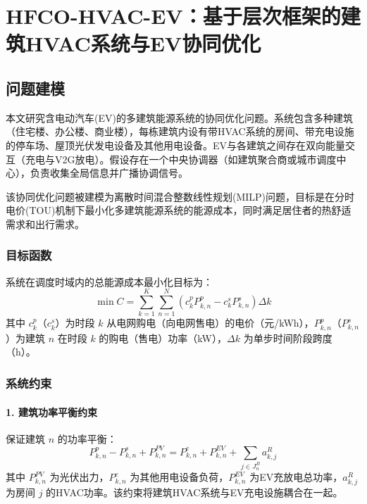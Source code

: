 \documentclass[11pt]{ctexart}
\begin{document}
\section{HFCO-HVAC-EV：基于层次框架的建筑HVAC系统与EV协同优化}

\subsection{问题建模}

本文研究含电动汽车(EV)的多建筑能源系统的协同优化问题。系统包含多种建筑（住宅楼、办公楼、商业楼），每栋建筑内设有带HVAC系统的房间、带充电设施的停车场、屋顶光伏发电设备及其他用电设备。EV与各建筑之间存在双向能量交互（充电与V2G放电）。假设存在一个中央协调器（如建筑聚合商或城市调度中心），负责收集全局信息并广播协调信号。

该协同优化问题被建模为离散时间混合整数线性规划(MILP)问题，目标是在分时电价(TOU)机制下最小化多建筑能源系统的能源成本，同时满足居住者的热舒适需求和出行需求。

\subsubsection{目标函数}
系统在调度时域内的总能源成本最小化目标为：
\begin{equation}
    \min C = \sum_{k=1}^{K} \sum_{n=1}^{N} \left( c_k^p P_{k,n}^p - c_k^s P_{k,n}^s \right) \Delta k
\end{equation}
其中 $c_k^p$（$c_k^s$）为时段 $k$ 从电网购电（向电网售电）的电价（元/kWh），$P_{k,n}^p$（$P_{k,n}^s$）为建筑 $n$ 在时段 $k$ 的购电（售电）功率（kW），$\Delta k$ 为单步时间阶段跨度（h）。

\subsubsection{系统约束}

\paragraph{1. 建筑功率平衡约束}
保证建筑 $n$ 的功率平衡：
\begin{equation}
    P_{k,n}^p - P_{k,n}^s + P_{k,n}^{PV} = P_{k,n}^e + P_{k,n}^{EV} + \sum_{j \in J_n^B} a_{k,j}^R
\end{equation}
其中 $P_{k,n}^{PV}$ 为光伏出力，$P_{k,n}^e$ 为其他用电设备负荷，$P_{k,n}^{EV}$ 为EV充放电总功率，$a_{k,j}^R$ 为房间 $j$ 的HVAC功率。该约束将建筑HVAC系统与EV充电设施耦合在一起。
\end{document}
